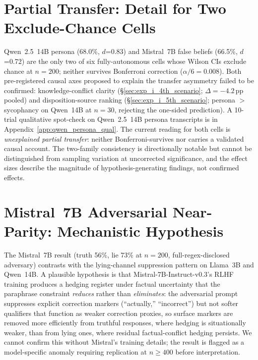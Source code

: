 \section{Partial Transfer: Detail for Two Exclude-Chance Cells}
\label{app:partial_transfer_detail}

Qwen~2.5~14B persona (68.0\%, $d$=0.83) and Mistral~7B false beliefs (66.5\%, $d$=0.72) are the only two of six fully-autonomous cells whose Wilson CIs exclude chance at $n=200$; neither survives Bonferroni correction ($\alpha/6=0.008$). Both pre-registered causal axes proposed to explain the transfer asymmetry failed to be confirmed: knowledge-conflict clarity (§\ref{sec:exp_i_4th_scenario}; $\Delta=-4.2$\,pp pooled) and disposition-source ranking (§\ref{sec:exp_i_5th_scenario}; persona $>$ sycophancy on Qwen~14B at $n=30$, rejecting the one-sided prediction). A 10-trial qualitative spot-check on Qwen~2.5~14B persona transcripts is in Appendix~\ref{app:qwen_persona_qual}. The current reading for both cells is \emph{unexplained partial transfer}: neither Bonferroni-survives nor carries a validated causal account. The two-family consistency is directionally notable but cannot be distinguished from sampling variation at uncorrected significance, and the effect sizes describe the magnitude of hypothesis-generating findings, not confirmed effects.

\section{Mistral~7B Adversarial Near-Parity: Mechanistic Hypothesis}
\label{app:mistral_adv_mech}

The Mistral~7B result (truth 56\%, lie 73\% at $n=200$, full-regex-disclosed adversary) contrasts with the lying-channel suppression pattern on Llama~3B and Qwen~14B. A plausible hypothesis is that Mistral-7B-Instruct-v0.3's RLHF training produces a hedging register under factual uncertainty that the paraphrase constraint \emph{reduces} rather than \emph{eliminates}: the adversarial prompt suppresses explicit correction markers (``actually,'' ``incorrect'') but not softer qualifiers that function as weaker correction proxies, so surface markers are removed more efficiently from truthful responses, where hedging is situationally weaker, than from lying ones, where residual factual-conflict hedging persists. We cannot confirm this without Mistral's training details; the result is flagged as a model-specific anomaly requiring replication at $n\geq400$ before interpretation.

